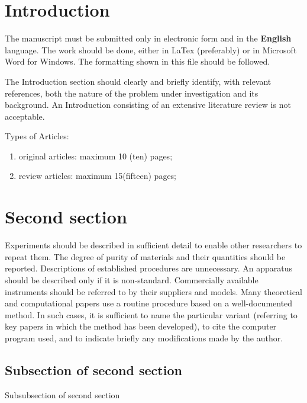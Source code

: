 \documentclass[article,10pt,twoside,a4paper,twocolumn,hidelinks,english,brazil]{abntex2}
\begin{document}

\textual
\OnehalfSpacing
\twocolumn
\pagestyle{text}


\section*{Introduction}

The manuscript must be submitted only in electronic form and in the \textbf{English} language.
The work should be done, either in LaTex (preferably) or in Microsoft Word for Windows. The formatting shown in this file should be followed.


The Introduction section should clearly and briefly identify, with relevant references, both the nature of the problem under investigation and its background. An Introduction consisting of an extensive literature review is not acceptable.

Types of Articles:

\begin{enumerate}
	     \item  original articles: maximum 10 (ten) pages; 
		 \item  review articles: maximum 15(fifteen) pages; 
\end{enumerate}

    

       
\section*{Second section}

Experiments should be described in sufficient detail to enable other researchers to repeat them. The degree of purity of materials and their quantities should be reported. Descriptions of established procedures are unnecessary. An apparatus should be described only if it is non-standard. Commercially available instruments should be referred to by their suppliers and models. 
Many theoretical and computational papers use a routine procedure based on a well-documented method. In such cases, it is sufficient to name the particular variant (referring to key papers in which the method has been developed), to cite the computer program used, and to indicate briefly any modifications made by the author. 

\subsection*{Subsection of second section }
Subsubsection of second section 
\end{document}
